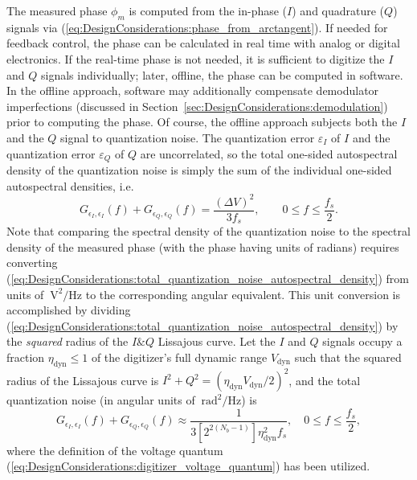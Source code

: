 The measured phase $\phi_m$ is computed from
the in-phase ($I$) and quadrature ($Q$) signals via
(\ref{eq:DesignConsiderations:phase_from_arctangent}).
If needed for feedback control,
the phase can be calculated in real time
with analog or digital electronics.
If the real-time phase is not needed,
it is sufficient to digitize the $I$ and $Q$ signals individually;
later, offline, the phase can be computed in software.
In the offline approach,
software may additionally compensate demodulator imperfections
(discussed in Section~\ref{sec:DesignConsiderations:demodulation})
prior to computing the phase.
Of course, the offline approach
subjects both the $I$ and the $Q$ signal to quantization noise.
The quantization error $\varepsilon_I$ of $I$ and
the quantization error $\varepsilon_Q$ of $Q$
are uncorrelated, so
the total one-sided autospectral density of the quantization noise is simply
the sum of the individual one-sided autospectral densities, i.e.\
\begin{equation}
  G_{\epsilon_I,\epsilon_I}(f)
  +
  G_{\epsilon_Q,\epsilon_Q}(f)
  =
  \frac{(\Delta V)^2}{3 f_s},
  \qquad
  0 \leq f \leq \frac{f_s}{2}.
  \label{eq:DesignConsiderations:total_quantization_noise_autospectral_density}
\end{equation}
Note that comparing the spectral density of the quantization noise
to the spectral density of the measured phase
(with the phase having units of radians)
requires converting
(\ref{eq:DesignConsiderations:total_quantization_noise_autospectral_density})
from units of $\SI{}{\volt\squared\per\Hz}$
to the corresponding angular equivalent.
This unit conversion is accomplished by dividing
(\ref{eq:DesignConsiderations:total_quantization_noise_autospectral_density})
by the \emph{squared} radius of the $I\&Q$ Lissajous curve.
Let the $I$ and $Q$ signals occupy
a fraction $\eta_{\text{dyn}} \leq 1$ of
the digitizer's full dynamic range $V_{\text{dyn}}$ such that
the squared radius of the Lissajous curve is
$I^2 + Q^2 = (\eta_{\text{dyn}} V_{\text{dyn}} / 2)^2$, and
the total quantization noise
(in angular units of $\SI{}{\radian\squared\per\Hz}$) is
\begin{equation}
  G_{\epsilon_I,\epsilon_I}(f)
  +
  G_{\epsilon_Q,\epsilon_Q}(f)
  \approx
  \frac{1}{3 \left[ 2^{2 (N_b - 1)} \right] \eta_{\text{dyn}}^2 f_s},
  \quad
  0 \leq f \leq \frac{f_s}{2},
  \label{eq:DesignConsiderations:total_quantization_noise_autospectral_density_angular_units}
\end{equation}
where the definition of the voltage quantum
(\ref{eq:DesignConsiderations:digitizer_voltage_quantum})
has been utilized.


